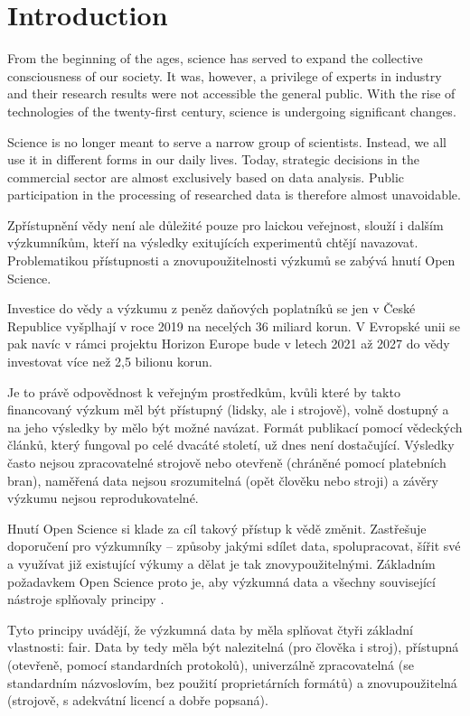 \chapter{Introduction}

From the beginning of the ages, science has served to expand the collective consciousness of our society.
It was, however, a privilege of experts in industry and their research results were not accessible the general public.
With the rise of technologies of the twenty-first century, science is undergoing significant changes.

Science is no longer meant to serve a narrow group of scientists.
Instead, we all use it in different forms in our daily lives.
Today, strategic decisions in the commercial sector are almost exclusively based on data analysis.
Public participation in the processing of researched data is therefore almost unavoidable.

Zpřístupnění vědy není ale důležité pouze pro laickou veřejnost, slouží i dalším výzkumníkům, kteří na výsledky exitujících experimentů chtějí navazovat.
Problematikou přístupnosti a znovupoužitelnosti výzkumů se zabývá hnutí Open Science.

Investice do vědy a výzkumu z peněz daňových poplatníků se jen v České Republice vyšplhají v roce 2019 na necelých 36 miliard korun\cite{rvvi-budget}.
V Evropské unii se pak navíc v rámci projektu Horizon Europe bude v letech 2021 až 2027 do vědy investovat více než 2,5 bilionu korun\cite{euc-horizon-budget}.

Je to právě odpovědnost k veřejným prostředkům, kvůli které by takto financovaný výzkum měl být přístupný (lidsky, ale i strojově), volně dostupný a na jeho výsledky by mělo být možné navázat.
Formát publikací pomocí vědeckých článků, který fungoval po celé dvacáté století, už dnes není dostačující.
Výsledky často nejsou zpracovatelné strojově nebo otevřeně (chráněné pomocí platebních bran), naměřená data nejsou srozumitelná (opět člověku nebo stroji) a závěry výzkumu nejsou reprodukovatelné.

Hnutí Open Science si klade za cíl takový přístup k vědě změnit.
Zastřešuje doporučení pro výzkumníky -- způsoby jakými sdílet data, spolupracovat, šířit své a využívat již existující výkumy a dělat je tak znovypoužitelnými.
Základním požadavkem Open Science proto je, aby výzkumná data a všechny související nástroje splňovaly principy .

Tyto principy uvádějí, že výzkumná data by měla splňovat čtyři základní vlastnosti: \gls{fair}.
Data by tedy měla být nalezitelná (pro člověka i stroj), přístupná (otevřeně, pomocí standardních protokolů), univerzálně zpracovatelná (se standardním názvoslovím, bez použití proprietárních formátů) a znovupoužitelná (strojově, s adekvátní licencí a dobře popsaná).

